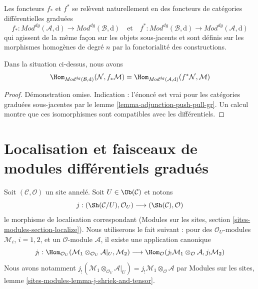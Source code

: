 \medskip\noindent
Les foncteurs $f_*$ et $f^*$ se relèvent naturellement en des
foncteurs de catégories différentielles graduées
$$
f_*
: \textit{Mod}^{dg}(\mathcal{A}, \text{d})
\longrightarrow
\textit{Mod}^{dg}(\mathcal{B}, \text{d})
\quad\text{et}\quad f^*
:
\textit{Mod}^{dg}(\mathcal{B}, \text{d})
\longrightarrow
\textit{Mod}^{dg}(\mathcal{A}, \text{d})
$$ qui
agissent de la même façon sur les objets sous-jacents et sont définis
sur les morphismes homogènes de degré
$n$ par la fonctorialité des constructions.

\begin{lemma}
\label{lemma-adjunction-push-pull-dg} Dans
la situation ci-dessus, nous
avons $$
\Hom_{\textit{Mod}^{dg}(\mathcal{B}, \text{d})}(
\mathcal{N}, f_*\mathcal{M})
= \Hom_{\textit{Mod}^{dg}(\mathcal{A}, \text{d})}(
f^*\mathcal{N}, \mathcal{M})
$$
\end{lemma}

\begin{proof}
Démonstration omise. Indication : l'énoncé est vrai pour les catégories graduées
sous-jacentes par le lemme \ref{lemma-adjunction-push-pull-gr}. Un calcul
montre que ces isomorphismes sont compatibles avec les différentiels.
\end{proof}















\section{Localisation et faisceaux de modules différentiels gradués}
\label{section-localize-dg}

\noindent
Soit $(\mathcal{C}, \mathcal{O})$ un site annelé. Soit
$U \in \Ob(\mathcal{C})$ et notons
$$ j
:
(\Sh(\mathcal{C}/U), \mathcal{O}_U)
\longrightarrow
(\Sh(\mathcal{C}), \mathcal{O})
$$ le
morphisme de localisation correspondant (Modules
sur les sites, section \ref{sites-modules-section-localize}). Nous
utiliserons le fait suivant : pour des $\mathcal{O}_U$-modules
$\mathcal{M}_i$, $i = 1, 2$, et un $\mathcal{O}$-module $\mathcal{A}$, il
existe une application canonique
$$
j_!
: \Hom_{\mathcal{O}_U}(
\mathcal{M}_1 \otimes_{\mathcal{O}_U} \mathcal{A}|_U, \mathcal{M}_2)
\longrightarrow
\Hom_\mathcal{O}(
j_!\mathcal{M}_1 \otimes_\mathcal{O} \mathcal{A}, j_!\mathcal{M}_2)
$$
Nous avons notamment
$j_!(\mathcal{M}_1 \otimes_{\mathcal{O}_U} \mathcal{A}|_U) =
j_!\mathcal{M}_1 \otimes_\mathcal{O} \mathcal{A}$ par
Modules sur les sites, lemme \ref{sites-modules-lemma-j-shriek-and-tensor}.

